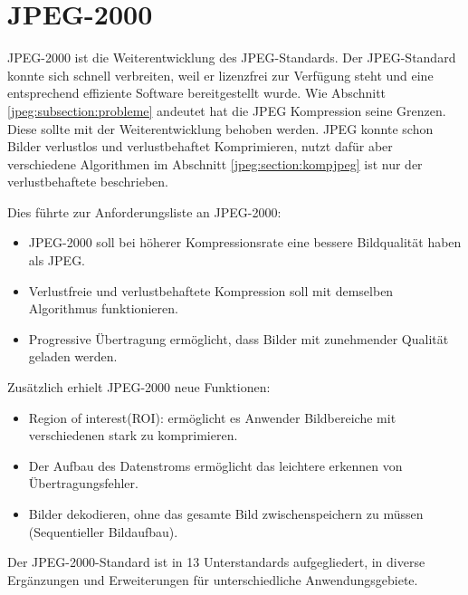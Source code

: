 %
%
%
%
\section{JPEG-2000 
\label{jpeg:section:jpeg2000}}
JPEG-2000 ist die Weiterentwicklung des JPEG-Standards.
Der JPEG-Standard konnte sich schnell verbreiten, weil er lizenzfrei zur Verfügung steht und eine entsprechend effiziente Software bereitgestellt wurde.
Wie Abschnitt \ref{jpeg:subsection:probleme} andeutet hat die JPEG Kompression seine Grenzen.
Diese sollte mit der Weiterentwicklung behoben werden. 
JPEG konnte schon Bilder verlustlos und verlustbehaftet Komprimieren, nutzt dafür aber verschiedene Algorithmen im Abschnitt \ref{jpeg:section:kompjpeg} ist nur der verlustbehaftete beschrieben.


Dies führte zur Anforderungsliste an JPEG-2000:
\begin{itemize}
    \item JPEG-2000 soll bei höherer Kompressionsrate eine bessere Bildqualität haben als JPEG.
    \item Verlustfreie und verlustbehaftete Kompression soll mit demselben Algorithmus funktionieren.
    \item Progressive Übertragung ermöglicht, dass Bilder mit zunehmender Qualität geladen werden.
\end{itemize}
Zusätzlich erhielt JPEG-2000 neue Funktionen:
\begin{itemize}
    \item Region of interest(ROI): ermöglicht es Anwender Bildbereiche mit verschiedenen stark zu komprimieren.
    \item Der Aufbau des Datenstroms ermöglicht das leichtere erkennen von Übertragungsfehler.
    \item Bilder dekodieren, ohne das gesamte Bild zwischenspeichern zu müssen (Sequentieller Bildaufbau).
\end{itemize}
Der JPEG-2000-Standard ist in 13 Unterstandards aufgegliedert, in diverse Ergänzungen und Erweiterungen für unterschiedliche Anwendungsgebiete. 


